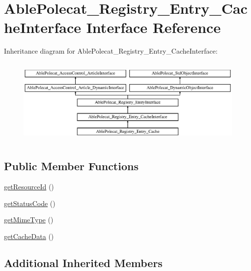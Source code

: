 \hypertarget{interface_able_polecat___registry___entry___cache_interface}{}\section{Able\+Polecat\+\_\+\+Registry\+\_\+\+Entry\+\_\+\+Cache\+Interface Interface Reference}
\label{interface_able_polecat___registry___entry___cache_interface}
Inheritance diagram for Able\+Polecat\+\_\+\+Registry\+\_\+\+Entry\+\_\+\+Cache\+Interface\+:\begin{figure}[H]
\begin{center}
\leavevmode
\includegraphics[height=4.268293cm]{interface_able_polecat___registry___entry___cache_interface}
\end{center}
\end{figure}
\subsection*{Public Member Functions}
\begin{DoxyCompactItemize}
\item 
\hyperlink{interface_able_polecat___registry___entry___cache_interface_a0ac412173b2b1d569ef90a1ac095ca5d}{get\+Resource\+Id} ()
\item 
\hyperlink{interface_able_polecat___registry___entry___cache_interface_a094778dd1c04fe44626000b47ea0c0bb}{get\+Status\+Code} ()
\item 
\hyperlink{interface_able_polecat___registry___entry___cache_interface_ac06e9f7b10fca30eb41e41d4dc108b1c}{get\+Mime\+Type} ()
\item 
\hyperlink{interface_able_polecat___registry___entry___cache_interface_a991b958b6b972356b973a9c68306bc4f}{get\+Cache\+Data} ()
\end{DoxyCompactItemize}
\subsection*{Additional Inherited Members}


